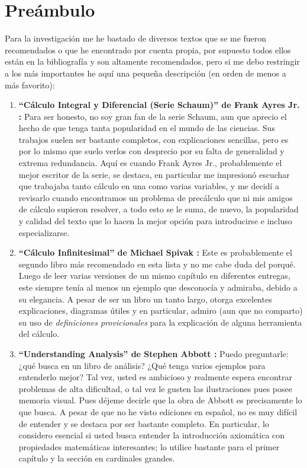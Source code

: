 \documentclass[11pt,oneside,a4paper]{book}
\begin{document}
\chapter*{Preámbulo}
Para la investigación me he bastado de diversos textos que se me fueron recomendados o que he encontrado por cuenta propia, por supuesto todos ellos están en la bibliografía y son altamente recomendados, pero si me debo restringir a los más importantes he aquí una pequeña descripción (en orden de menos a más favorito):
\begin{enumerate}
\item \textbf{``Cálculo Integral y Diferencial (Serie Schaum)'' de Frank Ayres Jr. \cite{ayres1991calculo}:} Para ser honesto, no soy gran fan de la serie Schaum, aun que aprecio el hecho de que tenga tanta popularidad en el mundo de las ciencias. Sus trabajos suelen ser bastante completos, con explicaciones sencillas, pero es por lo mismo que suelo verlos con desprecio por su falta de generalidad y extrema redundancia. Aquí es cuando Frank Ayres Jr., probablemente el mejor escritor de la serie, se destaca, en particular me impresionó escuchar que trabajaba tanto cálculo en una como varias variables, y me decidí a revisarlo cuando encontramos un problema de precálculo que ni mis amigos de cálculo supieron resolver, a todo esto se le suma, de nuevo, la popularidad y calidad del texto que lo hacen la mejor opción para introducirse e incluso especializarse.
\item \textbf{``Cálculo Infinitesimal'' de Michael Spivak \cite{spivak1996calculo}:} Este es probablemente el segundo libro más recomendado en esta lista y no me cabe duda del porqué. Luego de leer varias versiones de un mismo capítulo en diferentes entregas, este siempre tenía al menos un ejemplo que desconocía y admiraba, debido a su elegancia. A pesar de ser un libro un tanto largo, otorga excelentes explicaciones, diagramas útiles y en particular, admiro (aun que no comparto) su uso de \textit{definiciones provicionales} para la explicación de alguna herramienta del cálculo.
\item \textbf{``Understanding Analysis'' de Stephen Abbott \cite{abbott2001understanding}:} Puedo preguntarle: ¿qué busca en un libro de análisis? ¿Qué tenga varios ejemplos para entenderlo mejor? Tal vez, usted es ambicioso y realmente espera encontrar problemas de alta dificultad, o tal vez le gusten las ilustraciones pues posee memoria visual. Pues déjeme decirle que la obra de Abbott es precisamente lo que busca. A pesar de que no he visto ediciones en español, no es muy difícil de entender y se destaca por ser bastante completo. En particular, lo considero esencial si usted busca entender la introducción axiomática con propiedades matemáticas interesantes; lo utilice bastante para el primer capítulo y la sección en cardinales grandes.

\end{enumerate}
\end{document}
